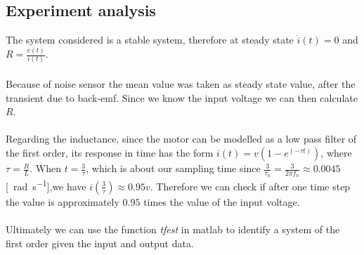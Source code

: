 \subsection{Experiment analysis}
The system considered is a stable system, therefore at steady state $\dot{i}(t) = 0$ and $R = \frac{v(t)}{i(t)}$. \\ \\
Because of noise sensor the mean value was taken as steady state value, after the transient due to back-emf. Since we know the input voltage we can then calculate $R$. \\ \\
Regarding the inductance, since the motor can be modelled as a low pass filter of the first order, its response in time has the form $i(t) = v (1-e^(-\tau t))$, where $\tau = \frac{R}{L}$.  When $t=\frac{3}{\tau}$, which is about our sampling time since $\frac{3}{\tau_n}=\frac{3}{2\pi f_n} \approx 0.0045$ [\SI{}{\radian \per \second}],we have $i(\frac{3}{\tau}) \approx 0.95v$. Therefore we can check if after one time step the value is approximately $0.95$ times the value of the input voltage. \\ \\ 
Ultimately we can use the function \emph{tfest} in matlab to identify a system of the first order given the input and output data.
